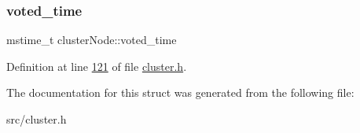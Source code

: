 \subsubsection{\texorpdfstring{voted\+\_\+time}{voted\_time}}
{\footnotesize\ttfamily mstime\+\_\+t cluster\+Node\+::voted\+\_\+time}



Definition at line \hyperlink{cluster_8h_source_l00121}{121} of file \hyperlink{cluster_8h_source}{cluster.\+h}.



The documentation for this struct was generated from the following file\+:\begin{DoxyCompactItemize}
\item 
src/cluster.\+h\end{DoxyCompactItemize}
